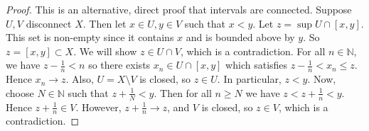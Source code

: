 \begin{proof}
	This is an alternative, direct proof that intervals are connected.
	Suppose \( U, V \) disconnect \( X \).
	Then let \( x \in U, y \in V \) such that \( x < y \).
	Let \( z = \sup U \cap [x,y] \).
	This set is non-empty since it contains \( x \) and is bounded above by \( y \).
	So \( z = [x,y] \subset X \).
	We will show \( z \in U \cap V \), which is a contradiction.
	For all \( n \in \mathbb N \), we have \( z - \frac{1}{n} < n \) so there exists \( x_n \in U \cap [x,y] \) which satisfies \( z - \frac{1}{n} < x_n \leq z \).
	Hence \( x_n \to z \).
	Also, \( U = X \setminus V \) is closed, so \( z \in U \).
	In particular, \( z < y \).
	Now, choose \( N \in \mathbb N \) such that \( z + \frac{1}{N} < y \).
	Then for all \( n \geq N \) we have \( z < z + \frac{1}{n} < y \).
	Hence \( z + \frac{1}{n} \in V \).
	However, \( z + \frac{1}{n} \to z \), and \( V \) is closed, so \( z \in V \), which is a contradiction.
\end{proof}
